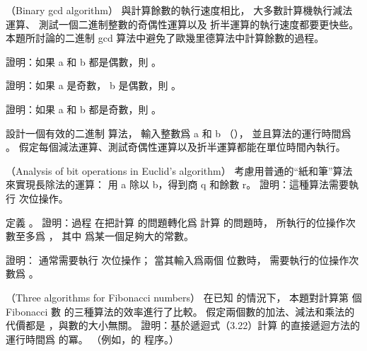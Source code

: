 \startsubject[
  title={Problems},
]

\startPROBLEM
（Binary gcd algorithm）
與計算餘數的執行速度相比，
大多數計算機執行減法運算、
測試一個二進制整數的奇偶性運算以及
折半運算的執行速度都要更快些。
本題所討論的{\EMP 二進制 gcd 算法}中避免了歐幾里德算法中計算餘數的過程。

\startigBase[a]\startitem
證明：如果 a 和 b 都是偶數，則 。
\stopitem\stopigBase

\startANSWER
{}
\stopANSWER

\startigBase[continue]\startitem
證明：如果 a 是奇數， b 是偶數，則 。
\stopitem\stopigBase

\startANSWER
{}
\stopANSWER

\startigBase[continue]\startitem
證明：如果 a 和 b 都是奇數，則 。
\stopitem\stopigBase

\startANSWER
{}
\stopANSWER

\startigBase[continue]\startitem
設計一個有效的二進制 \m{\gcd} 算法，
輸入整數爲 a 和 b （），
並且算法的運行時間爲 。
假定每個減法運算、測試奇偶性運算以及折半運算都能在單位時間內執行。
\stopitem\stopigBase

\startANSWER
{}
\stopANSWER
\stopPROBLEM

\startPROBLEM
（Analysis of bit operations in Euclid’s algorithm）
\startigBase[a]\startitem
考慮用普通的“紙和筆”算法來實現長除法的運算：
用 a 除以 b，得到商 q 和餘數 r。
證明：這種算法需要執行  次位操作。
\stopitem\stopigBase

\startANSWER
{}
\stopANSWER

\startigBase[continue]\startitem
定義 。
證明：過程  在把計算  的問題轉化爲
計算  的問題時，
所執行的位操作次數至多爲 ，
其中  爲某一個足夠大的常數。
\stopitem\stopigBase

\startANSWER
{}
\stopANSWER

\startigBase[continue]\startitem
證明：  通常需要執行  次位操作；
當其輸入爲兩個 \m{\beta} 位數時，
需要執行的位操作次數爲 。
\stopitem\stopigBase

\startANSWER
{}
\stopANSWER
\stopPROBLEM

\startPROBLEM
（Three algorithms for Fibonacci numbers）
在已知  的情況下，
本題對計算第  個 Fibonacci 數  的三種算法的效率進行了比較。
假定兩個數的加法、減法和乘法的代價都是 ，與數的大小無關。
\startigBase[a]\startitem
證明：基於遞迴式（3.22）計算  的直接遞迴方法的運行時間爲  的冪。
（例如，\insection[27.1] 的  程序。）
\stopitem\stopigBase

